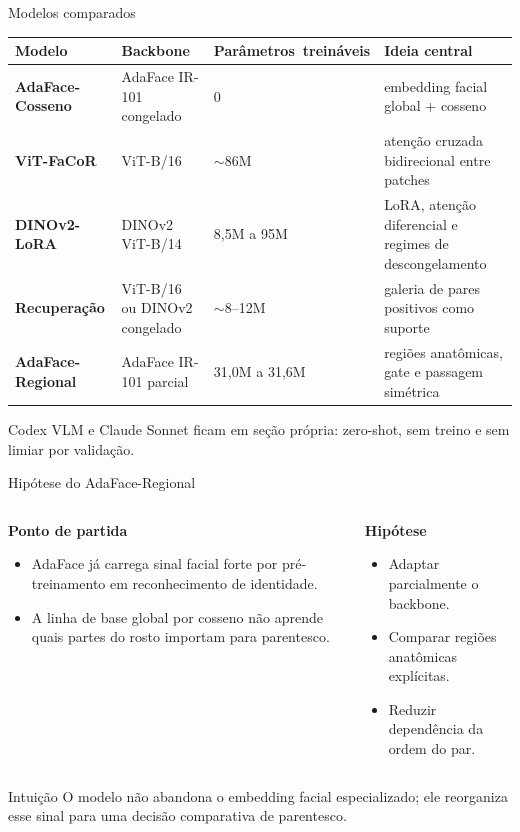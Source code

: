 \documentclass[aspectratio=169,10pt]{beamer}
\begin{document}
\begin{frame}{Modelos comparados}
  \scriptsize
  \setlength{\tabcolsep}{3.5pt}
  \begin{tabularx}{\textwidth}{>{\bfseries}p{2.45cm}p{2.75cm}p{3.05cm}Y}
    \toprule
    Modelo & Backbone & \mbox{Parâmetros treináveis} & Ideia central \\
    \midrule
    AdaFace-Cosseno & AdaFace IR-101 congelado & 0 & embedding facial global + cosseno \\
    ViT-FaCoR & ViT-B/16 & $\sim$86M & atenção cruzada bidirecional entre patches \\
    DINOv2-LoRA & DINOv2 ViT-B/14 & 8,5M a 95M & LoRA, atenção diferencial e regimes de descongelamento \\
    Recuperação & ViT-B/16 ou DINOv2 congelado & $\sim$8--12M & galeria de pares positivos como suporte \\
    AdaFace-Regional & AdaFace IR-101 parcial & 31,0M a 31,6M & regiões anatômicas, gate e passagem simétrica \\
    \bottomrule
  \end{tabularx}

  \vspace{0.45cm}
  \centering
  {\small Codex VLM e Claude Sonnet ficam em seção própria: zero-shot, sem treino e sem limiar por validação.}
\end{frame}

\begin{frame}{Hipótese do AdaFace-Regional}
  \begin{columns}[T,onlytextwidth]
    \begin{column}{0.48\textwidth}
      \textbf{Ponto de partida}
      \begin{itemize}
        \item AdaFace já carrega sinal facial forte por pré-treinamento em reconhecimento de identidade.
        \item A linha de base global por cosseno não aprende quais partes do rosto importam para parentesco.
      \end{itemize}
    \end{column}
    \begin{column}{0.49\textwidth}
      \textbf{Hipótese}
      \begin{itemize}
        \item Adaptar parcialmente o backbone.
        \item Comparar regiões anatômicas explícitas.
        \item Reduzir dependência da ordem do par.
      \end{itemize}
    \end{column}
  \end{columns}

  \vspace{0.5cm}
  \begin{block}{Intuição}
    O modelo não abandona o embedding facial especializado; ele reorganiza esse sinal para uma decisão comparativa de parentesco.
  \end{block}
\end{frame}
\end{document}
